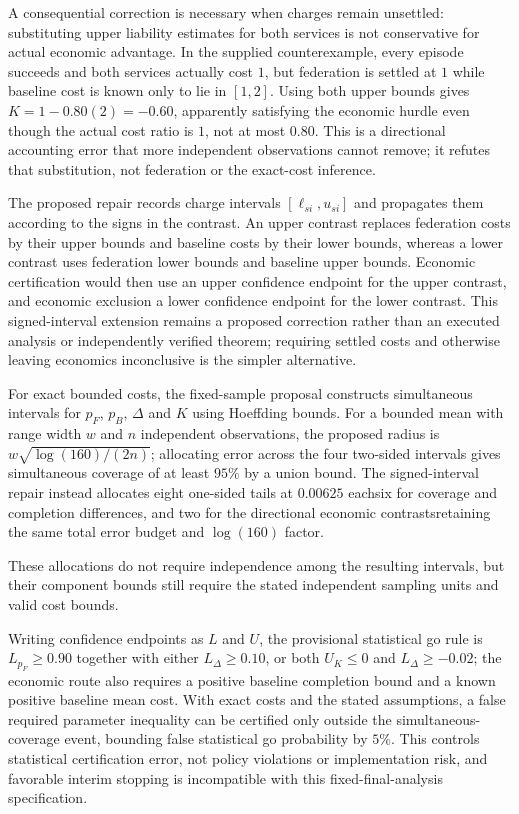 \documentclass[11pt]{article}
\begin{document}
A consequential correction is necessary when charges remain unsettled: substituting upper liability estimates for both services is not conservative for actual economic advantage. In the supplied counterexample, every episode succeeds and both services actually cost $1$, but federation is settled at $1$ while baseline cost is known only to lie in $[1,2]$. Using both upper bounds gives $K=1-0.80(2)=-0.60$, apparently satisfying the economic hurdle even though the actual cost ratio is $1$, not at most $0.80$. This is a directional accounting error that more independent observations cannot remove; it refutes that substitution, not federation or the exact-cost inference.

The proposed repair records charge intervals $[\ell_{si},u_{si}]$ and propagates them according to the signs in the contrast. An upper contrast replaces federation costs by their upper bounds and baseline costs by their lower bounds, whereas a lower contrast uses federation lower bounds and baseline upper bounds. Economic certification would then use an upper confidence endpoint for the upper contrast, and economic exclusion a lower confidence endpoint for the lower contrast. This signed-interval extension remains a proposed correction rather than an executed analysis or independently verified theorem; requiring settled costs and otherwise leaving economics inconclusive is the simpler alternative.

For exact bounded costs, the fixed-sample proposal constructs simultaneous intervals for $p_F$, $p_B$, $\Delta$ and $K$ using Hoeffding bounds. For a bounded mean with range width $w$ and $n$ independent observations, the proposed radius is $w\sqrt{\log(160)/(2n)}$; allocating error across the four two-sided intervals gives simultaneous coverage of at least $95\%$ by a union bound. The signed-interval repair instead allocates eight one-sided tails at $0.00625$ each\textemdash{}six for coverage and completion differences, and two for the directional economic contrasts\textemdash{}retaining the same total error budget and $\log(160)$ factor.

These allocations do not require independence among the resulting intervals, but their component bounds still require the stated independent sampling units and valid cost bounds.

Writing confidence endpoints as $L$ and $U$, the provisional statistical go rule is $L_{p_F}\geq0.90$ together with either $L_{\Delta}\geq0.10$, or both $U_K\leq0$ and $L_{\Delta}\geq-0.02$; the economic route also requires a positive baseline completion bound and a known positive baseline mean cost. With exact costs and the stated assumptions, a false required parameter inequality can be certified only outside the simultaneous-coverage event, bounding false statistical go probability by $5\%$. This controls statistical certification error, not policy violations or implementation risk, and favorable interim stopping is incompatible with this fixed-final-analysis specification.
\end{document}

